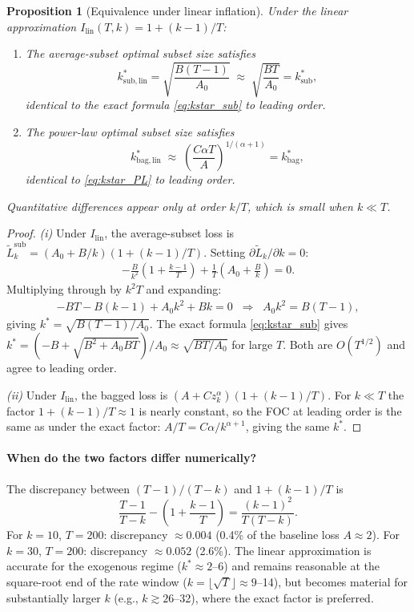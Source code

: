 \documentclass[12pt,a4paper]{article}
\newtheorem{proposition}{Proposition}
\theoremstyle{definition}
\begin{document}
\begin{proposition}[Equivalence under linear inflation]\label{prop:linflation}
Under the linear approximation $I_{\mathrm{lin}}(T,k)=1+(k-1)/T$:
\begin{enumerate}[label=(\roman*)]
  \item The average-subset optimal subset size satisfies
    \[
      k^*_{\mathrm{sub,lin}} = \sqrt{\frac{B(T-1)}{A_0}}
      \;\approx\; \sqrt{\frac{BT}{A_0}} = k^*_{\mathrm{sub}},
    \]
    identical to the exact formula \eqref{eq:kstar_sub} to leading order.
  \item The power-law optimal subset size satisfies
    \[
      k^*_{\mathrm{bag,lin}} \;\approx\;
      \left(\frac{C\alpha T}{A}\right)^{1/(\alpha+1)} = k^*_{\mathrm{bag}},
    \]
    identical to \eqref{eq:kstar_PL} to leading order.
\end{enumerate}
Quantitative differences appear only at order $k/T$, which is small when
$k\ll T$.
\end{proposition}

\begin{proof}
\textit{(i)} Under $I_{\mathrm{lin}}$, the average-subset loss is
$\tilde L_k^{\mathrm{sub}}=(A_0+B/k)(1+(k-1)/T)$.  Setting
$\partial\tilde L_k/\partial k=0$:
\begin{align*}
  -\frac{B}{k^2}\!\left(1+\frac{k-1}{T}\right)
  + \frac{1}{T}\!\left(A_0+\frac{B}{k}\right) = 0.
\end{align*}
Multiplying through by $k^2 T$ and expanding:
\begin{align*}
  -BT - B(k-1) + A_0 k^2 + Bk = 0
  \;\;\Longrightarrow\;\;
  A_0 k^2 = B(T-1),
\end{align*}
giving $k^*=\sqrt{B(T-1)/A_0}$.  The exact formula \eqref{eq:kstar_sub}
gives $k^*=(-B+\sqrt{B^2+A_0BT})/A_0\approx\sqrt{BT/A_0}$ for large $T$.
Both are $O(T^{1/2})$ and agree to leading order.

\textit{(ii)} Under $I_{\mathrm{lin}}$, the bagged loss is
$(A+Cz_k^\alpha)(1+(k-1)/T)$.  For $k\ll T$ the factor $1+(k-1)/T\approx 1$
is nearly constant, so the FOC at leading order is the same as under the exact
factor: $A/T=C\alpha/k^{\alpha+1}$, giving the same $k^*$.
\end{proof}

\paragraph{When do the two factors differ numerically?}
The discrepancy between $(T-1)/(T-k)$ and $1+(k-1)/T$ is
\begin{equation}\label{eq:inflationdiff}
  \frac{T-1}{T-k} - \left(1+\frac{k-1}{T}\right)
  = \frac{(k-1)^2}{T(T-k)}.
\end{equation}
For $k=10$, $T=200$: discrepancy $\approx 0.004$ (0.4\% of the baseline
loss $A\approx 2$).  For $k=30$, $T=200$: discrepancy $\approx 0.052$ (2.6\%).
The linear approximation is accurate for the exogenous regime ($k^*\approx 2$--6)
and remains reasonable at the square-root end of the rate window
($k=\lfloor\sqrt{T}\rfloor\approx 9$--14), but becomes material for
substantially larger $k$ (e.g., $k\gtrsim 26$--32), where the exact factor
is preferred.
\end{document}
